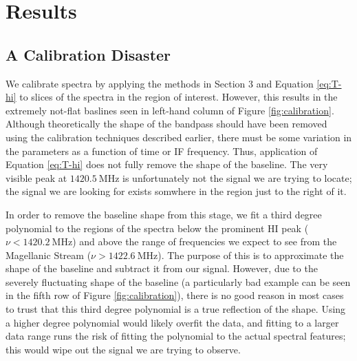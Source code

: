 \documentclass[12pt]{article}
\begin{document}
\section{Results}

\subsection*{A Calibration Disaster}
We calibrate spectra by applying the methods in Section 3 and Equation \ref{eq:T-hi} to slices of the spectra in the region of interest. However, this results in the extremely not-flat baslines seen in left-hand column of Figure \ref{fig:calibration}. Although theoretically the shape of the bandpass should have been removed using the calibration techniques described earlier, there must be some variation in the parameters as a function of time or IF frequency. Thus,  application of Equation \ref{eq:T-hi} does not fully remove the shape of the baseline. The very visible peak at $1420.5\ \mathrm{MHz}$ is unfortunately not the signal we are trying to locate; the signal we are looking for exists somwhere in the region just to the right of it.

In order to remove the baseline shape from this stage, we fit a third degree polynomial to the regions of the spectra below the prominent HI peak ($\nu < 1420.2\ \mathrm{MHz}$) and above the range of frequencies we expect to see from the Magellanic Stream ($\nu > 1422.6\ \mathrm{MHz}$). The purpose of this is to approximate the shape of the baseline and subtract it from our signal. However, due to the severely fluctuating shape of the baseline (a particularly bad example can be seen in the fifth row of Figure \ref{fig:calibration}), there is no good reason in most cases to trust that this third degree polynomial is a true reflection of the shape. Using a higher degree polynomial would likely overfit the data, and fitting to a larger data range runs the risk of fitting the polynomial to the actual spectral features; this would wipe out the signal we are trying to observe.
\end{document}
